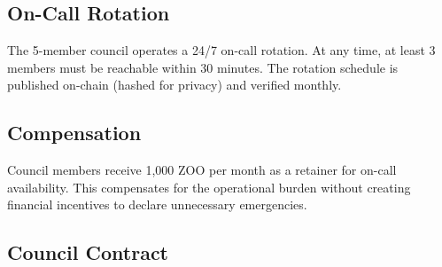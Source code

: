 \documentclass[11pt,letterpaper]{article}
\begin{document}
\subsection{On-Call Rotation}

The 5-member council operates a 24/7 on-call rotation. At any time, at least 3 members must be reachable within 30 minutes. The rotation schedule is published on-chain (hashed for privacy) and verified monthly.

\subsection{Compensation}

Council members receive 1{,}000 ZOO per month as a retainer for on-call availability. This compensates for the operational burden without creating financial incentives to declare unnecessary emergencies.

\subsection{Council Contract}
\end{document}
